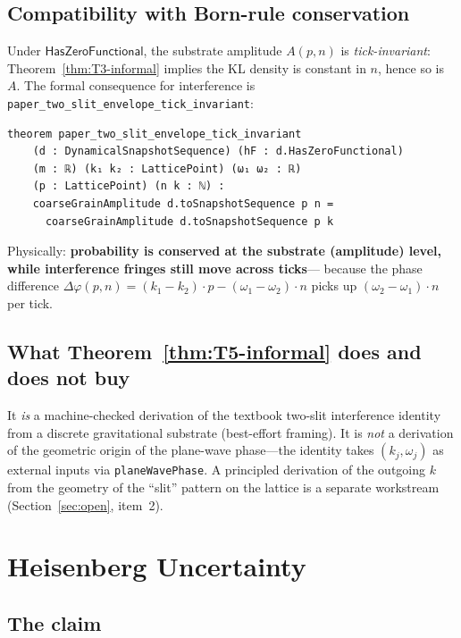 \documentclass[11pt,a4paper,twoside]{article}
\theoremstyle{definition}
\newcommand{\HasZF}{\mathsf{HasZeroFunctional}}
\newcommand{\code}[1]{\texttt{#1}}
\begin{document}
\subsection{Compatibility with Born-rule conservation}\label{sec:T5-born-compat}

Under $\HasZF$, the substrate amplitude $A(p,n)$ is
\emph{tick-invariant}: Theorem~\ref{thm:T3-informal} implies the KL
density is constant in $n$, hence so is $A$. The formal consequence
for interference is \code{paper\_two\_slit\_envelope\_tick\_invariant}:
\begin{lstlisting}
theorem paper_two_slit_envelope_tick_invariant
    (d : DynamicalSnapshotSequence) (hF : d.HasZeroFunctional)
    (m : ℝ) (k₁ k₂ : LatticePoint) (ω₁ ω₂ : ℝ)
    (p : LatticePoint) (n k : ℕ) :
    coarseGrainAmplitude d.toSnapshotSequence p n =
      coarseGrainAmplitude d.toSnapshotSequence p k
\end{lstlisting}

Physically: \textbf{probability is conserved at the substrate
(amplitude) level, while interference fringes still move across ticks}---
because the phase difference
$\Delta\varphi(p,n)=(k_{1}-k_{2})\cdot p-(\omega_{1}-\omega_{2})\cdot n$
picks up $(\omega_{2}-\omega_{1})\cdot n$ per tick.

\subsection{What Theorem~\ref{thm:T5-informal} does and does not
buy}\label{sec:T5-neg}

It \emph{is} a machine-checked derivation of the textbook two-slit
interference identity from a discrete gravitational substrate
(best-effort framing). It is \emph{not} a derivation of the geometric
origin of the plane-wave phase---the identity takes $(k_{j},\omega_{j})$
as external inputs via \code{planeWavePhase}. A principled derivation
of the outgoing $k$ from the geometry of the ``slit'' pattern on the
lattice is a separate workstream (Section~\ref{sec:open}, item~2).

\section{Heisenberg Uncertainty}\label{sec:heisenberg}

\subsection{The claim}\label{sec:heisenberg-claim}
\end{document}
